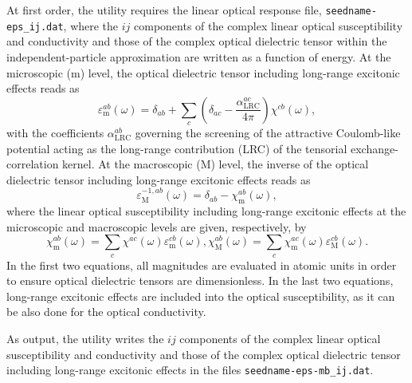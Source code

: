 At first order, the utility requires the linear optical response file, {\tt seedname-eps\_ij.dat}, where the $ij$ components of the complex linear optical susceptibility and conductivity and those of the complex optical dielectric tensor within the independent-particle approximation are written as a function of energy. At the microscopic (m) level, the optical dielectric tensor including long-range excitonic effects reads as
\begin{equation}
 \varepsilon^{ab}_{\mathrm{m}}(\omega)=\delta_{ab}+\sum_{c}\left(\delta_{ac}-\frac{\alpha^{ac}_{\mathrm{LRC}}}{4\pi}\right)\chi^{cb}(\omega),
\end{equation}
with the coefficients $\alpha^{ab}_{\mathrm{LRC}}$ governing the screening of the attractive Coulomb-like potential acting as the long-range contribution (LRC) of the tensorial exchange-correlation kernel. At the macroscopic (M) level, the inverse of the optical dielectric tensor including long-range excitonic effects reads as
\begin{equation}
 \varepsilon^{-1,ab}_{\mathrm{M}}(\omega)=\delta_{ab}-\chi_{\mathrm{m}}^{ab}(\omega),
\end{equation}
where the linear optical susceptibility including long-range excitonic effects at the microscopic and macroscopic levels are given, respectively, by
\begin{subequations}
 \begin{equation}
  \chi_{\mathrm{m}}^{ab}(\omega)=\sum_{c}\chi^{ac}(\omega)\varepsilon^{cb}_{\mathrm{m}}(\omega),
 \end{equation}
 \begin{equation}
  \chi_{\mathrm{M}}^{ab}(\omega)=\sum_{c}\chi_{\mathrm{m}}^{ac}(\omega)\varepsilon^{cb}_{\mathrm{M}}(\omega).
 \end{equation}
\end{subequations}
In the first two equations, all magnitudes are evaluated in atomic units in order to ensure optical dielectric tensors are dimensionless. In the last two equations, long-range excitonic effects are included into the optical susceptibility, as it can be also done for the optical conductivity.

As output, the utility writes the $ij$ components of the complex linear optical susceptibility and conductivity and those of the complex optical dielectric tensor including long-range excitonic effects in the files {\tt seedname-eps-mb\_ij.dat}.

